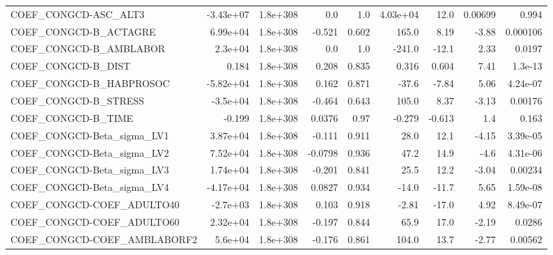 \begin{tabular}{lrrrrrrrr}
COEF\_CONGCD-ASC\_ALT3              &   -3.43e+07 &     1.8e+308 &     0.0 &      1.0 &   4.03e+04 &        12.0 &      0.00699 &         0.994 \\
COEF\_CONGCD-B\_ACTAGRE             &    6.99e+04 &     1.8e+308 &  -0.521 &    0.602 &      165.0 &        8.19 &        -3.88 &      0.000106 \\
COEF\_CONGCD-B\_AMBLABOR            &     2.3e+04 &     1.8e+308 &     0.0 &      1.0 &     -241.0 &       -12.1 &         2.33 &        0.0197 \\
COEF\_CONGCD-B\_DIST                &       0.184 &     1.8e+308 &   0.208 &    0.835 &      0.316 &       0.604 &         7.41 &       1.3e-13 \\
COEF\_CONGCD-B\_HABPROSOC           &   -5.82e+04 &     1.8e+308 &   0.162 &    0.871 &      -37.6 &       -7.84 &         5.06 &      4.24e-07 \\
COEF\_CONGCD-B\_STRESS              &    -3.5e+04 &     1.8e+308 &  -0.464 &    0.643 &      105.0 &        8.37 &        -3.13 &       0.00176 \\
COEF\_CONGCD-B\_TIME                &      -0.199 &     1.8e+308 &  0.0376 &     0.97 &     -0.279 &      -0.613 &          1.4 &         0.163 \\
COEF\_CONGCD-Beta\_sigma\_LV1        &    3.87e+04 &     1.8e+308 &  -0.111 &    0.911 &       28.0 &        12.1 &        -4.15 &      3.39e-05 \\
COEF\_CONGCD-Beta\_sigma\_LV2        &    7.52e+04 &     1.8e+308 & -0.0798 &    0.936 &       47.2 &        14.9 &         -4.6 &      4.31e-06 \\
COEF\_CONGCD-Beta\_sigma\_LV3        &    1.74e+04 &     1.8e+308 &  -0.201 &    0.841 &       25.5 &        12.2 &        -3.04 &       0.00234 \\
COEF\_CONGCD-Beta\_sigma\_LV4        &   -4.17e+04 &     1.8e+308 &  0.0827 &    0.934 &      -14.0 &       -11.7 &         5.65 &      1.59e-08 \\
COEF\_CONGCD-COEF\_ADULTO40         &    -2.7e+03 &     1.8e+308 &   0.103 &    0.918 &      -2.81 &       -17.0 &         4.92 &      8.49e-07 \\
COEF\_CONGCD-COEF\_ADULTO60         &    2.32e+04 &     1.8e+308 &  -0.197 &    0.844 &       65.9 &        17.0 &        -2.19 &        0.0286 \\
COEF\_CONGCD-COEF\_AMBLABORF2       &     5.6e+04 &     1.8e+308 &  -0.176 &    0.861 &      104.0 &        13.7 &        -2.77 &       0.00562 \\

\end{tabular}
